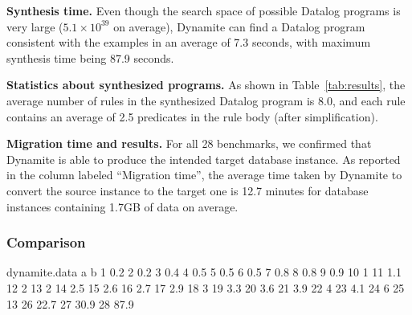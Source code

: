 \documentclass[]{article}
\begin{document}
                \textbf{Synthesis time.} Even though the search space of possible Datalog programs is very large ($5.1 \times 10^{39}$ on average), Dynamite can find a Datalog program consistent with the examples in an average of 7.3 seconds, with maximum synthesis time being 87.9 seconds. 

                \textbf{Statistics about synthesized programs.} As shown in Table~\ref{tab:results}, the average number of rules in the synthesized Datalog program is 8.0, and each rule contains an average of 2.5 predicates in the rule body (after simplification). 

                \textbf{Migration time and results.} For all 28 benchmarks, we confirmed that Dynamite is able to produce the intended target database instance. As reported in the column labeled ``Migration time'', the average time taken by Dynamite to convert the source instance to the target one is 12.7 minutes for database instances containing 1.7GB of data on average. 

            \subsubsection{Comparison}

                    \begin{filecontents}{dynamite.data}
                        a    b
                        1   0.2
                        2   0.2
                        3   0.4
                        4   0.5
                        5   0.5
                        6   0.5
                        7   0.8
                        8   0.8
                        9   0.9
                        10  1
                        11  1.1
                        12  2
                        13  2
                        14  2.5
                        15  2.6
                        16  2.7
                        17  2.9
                        18  3
                        19  3.3
                        20  3.6
                        21  3.9
                        22  4
                        23  4.1
                        24  6
                        25  13
                        26  22.7
                        27  30.9
                        28  87.9
                    \end{filecontents}
\end{document}
